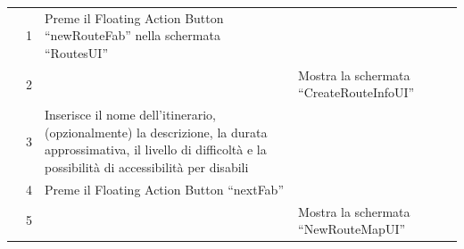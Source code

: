 \documentclass{natourDoc}
\begin{document}
\begin{tabularx}{\linewidth}{| l | p{1cm} | p{4cm} | X | X|}
	\cline{2-5}                   & 1                                                                                                                                      & Preme il Floating Action Button “newRouteFab” nella schermata “RoutesUI”
	                              &                                                                                                                                        &                                                                                                                                                                                                                                                                                                                    \\

	\cline{2-5}                   & 2                                                                                                                                      &                                                                                                                                                                      & Mostra la schermata “CreateRouteInfoUI”             &                                                                                       \\

	\cline{2-5}                   & 3                                                                                                                                      & Inserisce il nome dell’itinerario, (opzionalmente) la descrizione, la durata approssimativa, il livello di difficoltà e la possibilità di accessibilità per disabili &                                                     &                                                                                       \\

	\cline{2-5}                   & 4                                                                                                                                      & Preme il Floating Action Button “nextFab”                                                                                                                            &                                                     &                                                                                       \\

	\cline{2-5}                   & 5                                                                                                                                      &                                                                                                                                                                      & Mostra la schermata “NewRouteMapUI”                 &                                                                                       \\


\end{tabularx}
\end{document}

